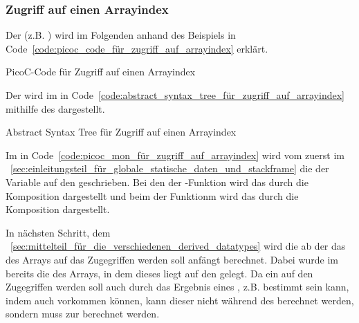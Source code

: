 \subsubsection{Zugriff auf einen Arrayindex}
\label{sec:zugriff_auf_arrayindex}

Der  (z.B. ) wird im Folgenden anhand des Beispiels in Code~\ref{code:picoc_code_für_zugriff_auf_arrayindex} erklärt.

\begin{code}
  \centering
  \caption{PicoC-Code für Zugriff auf einen Arrayindex}
  \label{code:picoc_code_für_zugriff_auf_arrayindex}
\end{code}

Der   wird im   in Code~\ref{code:abstract_syntax_tree_für_zugriff_auf_arrayindex} mithilfe des   dargestellt.

\begin{code}
  \centering
  \caption{Abstract Syntax Tree für Zugriff auf einen Arrayindex}
  \label{code:abstract_syntax_tree_für_zugriff_auf_arrayindex}
\end{code}

Im  in Code~\ref{code:picoc_mon_für_zugriff_auf_arrayindex} wird vom   zuerst im ~\ref{sec:einleitungsteil_für_globale_statische_daten_und_stackframe} die  der Variable  auf den  geschrieben. Bei den  der -Funktion wird das durch die Komposition  dargestellt und beim  der Funktionm  wird das durch die Komposition  dargestellt.

In nächsten Schritt, dem ~\ref{sec:mittelteil_für_die_verschiedenen_derived_datatypes} wird die  ab der das  des Arrays auf das Zugegriffen werden soll anfängt berechnet. Dabei wurde im  bereits die  des Arrays, in dem dieses  liegt auf den  gelegt. Da ein  auf den Zugegriffen werden soll auch durch das Ergebnis eines , z.B.  bestimmt sein kann, indem auch  vorkommen können, kann dieser nicht während des  berechnet werden, sondern muss zur  berechnet werden.

